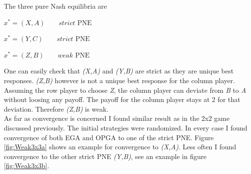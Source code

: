 The three pure Nash equilibria are

\begin{description}\centering
    \item $x^{*} = (X,A) \qquad \textit{strict }\text{PNE}$
    \item $x^{*} = (Y,C) \qquad \textit{strict }\text{PNE}$
    \item $x^{*} = (Z,B) \qquad \textit{weak }\text{PNE}$
\end{description}

One can easily check that \textit{(X,A)} and \textit{(Y,B)} are strict as they are unique best responses. \textit{(Z,B)} however is not a unique best response for the column player. Assuming the row player to choose \textit{Z}, the column player can deviate from \textit{B} to \textit{A} without loosing any payoff. The payoff for the column player stays at $2$ for that deviation. Therefore \textit{(Z,B)} is weak. \\

As far as convergence is concerned I found similar result as in the 2x2 game discussed previously. The initial strategies were randomized. In every case I found convergence of both EGA and OPGA to one of the strict PNE. Figure \ref{fig:Weak3x3a} shows an example for convergence to \textit{(X,A)}. Less often I found convergence to the other strict PNE \textit{(Y,B)}, see an example in figure \ref{fig:Weak3x3b}. 

